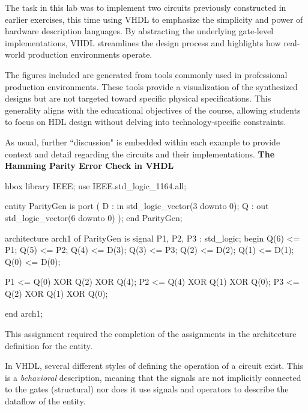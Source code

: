 \documentclass[12pt]{article}
\begin{document}
The task in this lab was to implement two circuits previously constructed in
earlier exercises, this time using VHDL to emphasize the simplicity and power of
hardware description languages. By abstracting the underlying gate-level
implementations, VHDL streamlines the design process and highlights how
real-world production environments operate.

The figures included are generated from tools commonly used in professional production environments. These tools provide a visualization of the synthesized designs but are not targeted toward specific physical specifications. This generality aligns with the educational objectives of the course, allowing students to focus on HDL design without delving into technology-specific constraints.

As usual, further ``discussion" is embedded within each example to provide context and detail regarding the circuits and their implementations.
\textbf{The Hamming Parity Error Check in VHDL}\\

\begin{TermUnix}{hbox}
	library IEEE;
	use IEEE.std_logic_1164.all;


	entity ParityGen is
	port (
	D : in	std_logic_vector(3 downto 0);
	Q : out std_logic_vector(6 downto 0)
	);
	end ParityGen;

	architecture arch1 of ParityGen is
	signal P1, P2, P3 : std_logic;
	begin
	Q(6) <= P1;
	Q(5) <= P2;
	Q(4) <= D(3);
	Q(3) <= P3;
	Q(2) <= D(2);
	Q(1) <= D(1);
	Q(0) <= D(0);

	P1 <= Q(0) XOR Q(2) XOR Q(4);
	P2 <= Q(4) XOR Q(1) XOR Q(0);
	P3 <= Q(2) XOR Q(1) XOR Q(0);

	end arch1;
\end{TermUnix}
This assignment required the completion of the assignments in the
architecture definition for the entity.

In VHDL, several different styles
of defining the operation of a circuit exist. This is a \textit{behavioral}
description, meaning that the signals are not implicitly connected to the
gates (structural) nor does it use signals and operators to describe the
dataflow of the entity.
\end{document}
